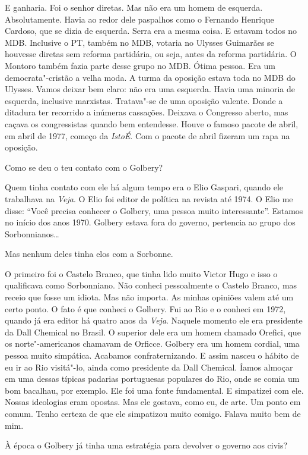 \falaM E ganharia. Foi o senhor diretas. Mas não era um homem de esquerda.
Absolutamente. Havia ao redor dele paspalhos como o Fernando Henrique
Cardoso, que se dizia de esquerda. Serra era a mesma coisa. E estavam
todos no MDB. Inclusive o PT, também no MDB, votaria no Ulysses
Guimarães se houvesse diretas sem reforma partidária, ou seja, antes da
reforma partidária. O Montoro também fazia parte desse grupo no MDB.
Ótima pessoa. Era um democrata"-cristão a velha moda. A turma da oposição
estava toda no MDB do Ulysses. Vamos deixar bem claro: não era uma
esquerda. Havia uma minoria de esquerda, inclusive marxistas. Tratava"-se
de uma oposição valente. Donde a ditadura ter recorrido a inúmeras
cassações. Deixava o Congresso aberto, mas caçava os congressistas
quando bem entendesse. Houve o famoso pacote de abril, em abril de 1977,
começo da \emph{IstoÉ}. Com o pacote de abril fizeram um rapa na
oposição.

\falaG Como se deu o teu contato com o Golbery?

\falaM Quem tinha contato com ele há algum tempo era o Elio Gaspari, quando
ele trabalhava na \emph{Veja}. O Elio foi editor de política na revista
até 1974. O Elio me disse: ``Você precisa conhecer o Golbery, uma pessoa
muito interessante''. Estamos no início dos anos 1970. Golbery estava
fora do governo, pertencia ao grupo dos Sorbonnianos…

\falaG Mas nenhum deles tinha elos com a Sorbonne.

\falaM O primeiro foi o Castelo Branco, que tinha lido muito Victor Hugo e
isso o qualificava como Sorbonniano. Não conheci pessoalmente o Castelo
Branco, mas receio que fosse um idiota. Mas não importa. As minhas
opiniões valem até um certo ponto. O fato é que conheci o Golbery. Fui
ao Rio e o conheci em 1972, quando já era editor há quatro anos da
\emph{Veja}. Naquele momento ele era presidente da Dall Chemical no
Brasil. O superior dele era um homem chamado Orefici, que os
norte"-americanos chamavam de Orficce. Golbery era um homem cordial, uma
pessoa muito simpática. Acabamos confraternizando. E assim nasceu o
hábito de eu ir ao Rio visitá"-lo, ainda como presidente da Dall
Chemical. Íamos almoçar em uma dessas típicas padarias portuguesas
populares do Rio, onde se comia um bom bacalhau, por exemplo. Ele foi
uma fonte fundamental. E simpatizei com ele. Nossas ideologias eram
opostas. Mas ele gostava, como eu, de arte. Um ponto em comum. Tenho
certeza de que ele simpatizou muito comigo. Falava muito bem de mim.

\falaG À época o Golbery já tinha uma estratégia para devolver o governo aos
civis?

